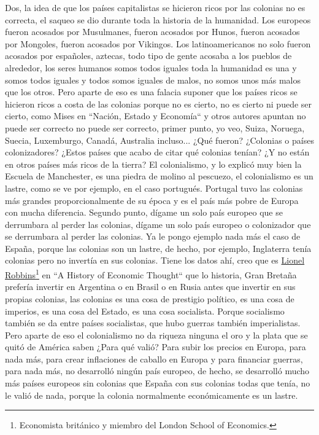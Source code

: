 Dos, la idea de que los países capitalistas se hicieron ricos por las colonias no es correcta, el saqueo se dio durante toda la historia de la humanidad. Los europeos fueron acosados por Musulmanes, fueron acosados por Hunos, fueron acosados por Mongoles, fueron acosados por Vikingos. Los latinoamericanos no solo fueron acosados por españoles, aztecas, todo tipo de gente acosaba a los pueblos de alrededor, los seres humanos somos todos iguales toda la humanidad es una y somos todos iguales y todos somos iguales de malos, no somos unos más malos que los otros. Pero aparte de eso es una falacia suponer que los países ricos se hicieron ricos a costa de las colonias porque no es cierto, no es cierto ni puede ser cierto, como Mises en ``Nación, Estado y Economía``\citep{vonmises1920nation} y otros autores apuntan no puede ser correcto no puede ser correcto, primer punto, yo veo, Suiza, Noruega, Suecia, Luxemburgo, Canadá, Australia incluso... ¿Qué fueron? ¿Colonias o países colonizadores? ¿Estos países que acabo de citar qué colonias tenían? ¿Y no están en otros países más ricos de la tierra? El colonialismo, y lo explicó muy bien la Escuela de Manchester, es una piedra de molino al pescuezo, el colonialismo es un lastre, como se ve por ejemplo, en el caso portugués. Portugal tuvo las colonias más grandes proporcionalmente de su época y es el país más pobre de Europa con mucha diferencia. Segundo punto, dígame un solo país europeo que se derrumbara al perder las colonias, dígame un solo país europeo o colonizador que se derrumbara al perder las colonias. Ya le pongo ejemplo nada más el caso de España, porque las colonias son un lastre, de hecho, por ejemplo, Inglaterra tenía colonias pero no invertía en sus colonias. Tiene los datos ahí, creo que es \href{https://en.wikipedia.org/wiki/Lionel_Robbins}{Lionel Robbins}\footnote{Economista británico y miembro del London School of Economics.} en ``A History of Economic Thought``\citep{robbins1998history} que lo historia, Gran Bretaña prefería invertir en Argentina o en Brasil o en Rusia antes que invertir en sus propias colonias, las colonias es una cosa de prestigio político, es una cosa de imperios, es una cosa del Estado, es una cosa socialista. Porque socialismo también se da entre países socialistas, que hubo guerras también imperialistas. Pero aparte de eso el colonialismo no da riqueza ninguna el oro y la plata que se quitó de América saben ¿Para qué valió? Para subir los precios en Europa, para nada más, para crear inflaciones de caballo en Europa y para financiar guerras, para nada más, no desarrolló ningún país europeo, de hecho, se desarrolló mucho más países europeos sin colonias que España con sus colonias todas que tenía,
no le valió de nada, porque la colonia normalmente económicamente es un lastre.

